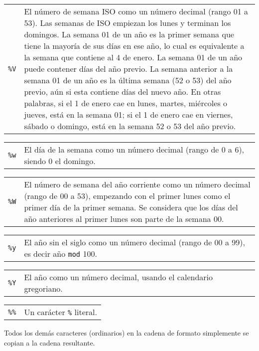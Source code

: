 \documentclass[11pt,spanish]{report}
\begin{document}
\begin{tabular}{@{}p{20pt}p{421.5pt}@{}}
{\tt\%V}&El número de semana ISO como un número decimal (rango 01 a 53). Las semanas de ISO empiezan los lunes y terminan los domingos. La semana 01 de un año es la primer semana que tiene la mayoría de sus días en ese año, lo cual es equivalente a la semana que contiene al 4 de enero. La semana 01 de un año puede contener días del año previo. La semana anterior a la semana 01 de un año es la última semana (52 o 53) del año previo, aún si esta contiene días del nuevo año. En otras palabras, si el 1 de enero cae en lunes, martes, miércoles o jueves, está en la semana 01; si el 1 de enero cae en viernes, sábado o domingo, está en la semana 52 o 53 del año previo.\\
\end{tabular}

\begin{tabular}{@{}p{20pt}p{421.5pt}@{}}
{\tt\%w}&El día de la semana como un número decimal (rango de 0 a 6), siendo 0 el domingo.\\
\end{tabular}

\begin{tabular}{@{}p{20pt}p{421.5pt}@{}}
{\tt\%W}&El número de semana del año corriente como un número decimal (rango de 00 a 53), empezando con el primer lunes como el primer día de la primer semana. Se considera que los días del año anteriores al primer lunes son parte de la semana 00.\\
\end{tabular}

\begin{tabular}{@{}p{20pt}p{421.5pt}@{}}
{\tt\%y}&El año sin el siglo como un número decimal (rango de 00 a 99), es decir año {\tt mod} 100.\\
\end{tabular}

\begin{tabular}{@{}p{20pt}p{421.5pt}@{}}
{\tt\%Y}&El año como un número decimal, usando el calendario gregoriano.\\
\end{tabular}

\begin{tabular}{@{}p{20pt}p{421.5pt}@{}}
{\tt\%\%}& Un carácter \verb|%| literal.\\
\end{tabular}

Todos los demás caracteres (ordinarios) en la cadena de formato simplemente se copian a la cadena resultante.
\end{document}
